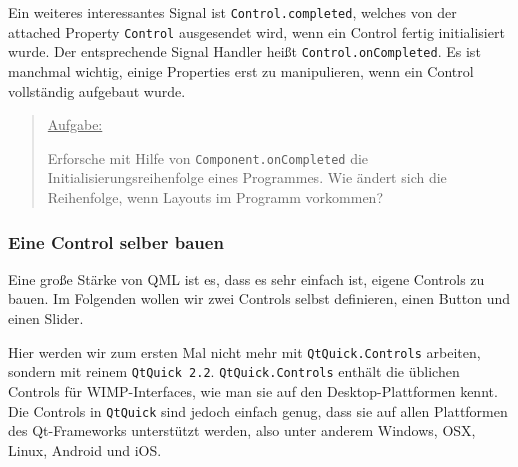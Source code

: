 \documentclass[a4paper]{article}
\begin{document}
Ein weiteres interessantes Signal ist \verb~Control.completed~, welches von der attached Property \verb~Control~ ausgesendet wird, wenn ein Control fertig initialisiert wurde. Der entsprechende Signal Handler heißt \verb~Control.onCompleted~. Es ist manchmal wichtig, einige Properties erst zu manipulieren, wenn ein Control vollständig aufgebaut wurde.

\begin{quote}
\uline{Aufgabe:}

Erforsche mit Hilfe von \verb~Component.onCompleted~ die Initialisierungsreihenfolge eines Programmes. Wie ändert sich die Reihenfolge, wenn Layouts im Programm vorkommen?
\end{quote}
\subsubsection{Eine Control selber bauen}
\label{sec-1-3-2}
Eine große Stärke von QML ist es, dass es sehr einfach ist, eigene Controls zu bauen. Im Folgenden wollen wir zwei Controls selbst definieren, einen Button und einen Slider.

Hier werden wir zum ersten Mal nicht mehr mit \verb~QtQuick.Controls~ arbeiten, sondern mit reinem \verb~QtQuick 2.2~. \verb~QtQuick.Controls~ enthält die üblichen Controls für WIMP-Interfaces, wie man sie auf den Desktop-Plattformen kennt. Die Controls in \verb~QtQuick~ sind jedoch einfach genug, dass sie auf allen Plattformen des Qt-Frameworks unterstützt werden, also unter anderem Windows, OSX, Linux, Android und iOS.
\end{document}
